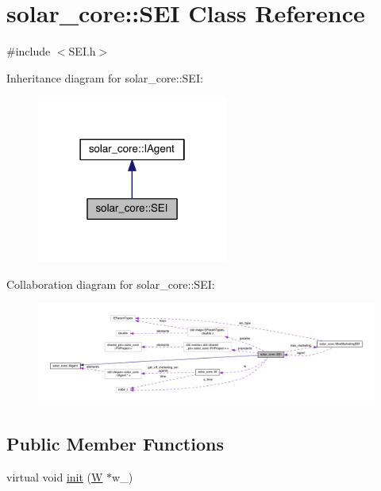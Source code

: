 \hypertarget{classsolar__core_1_1_s_e_i}{}\section{solar\+\_\+core\+:\+:S\+E\+I Class Reference}
\label{classsolar__core_1_1_s_e_i}


{\ttfamily \#include $<$S\+E\+I.\+h$>$}



Inheritance diagram for solar\+\_\+core\+:\+:S\+E\+I\+:
\nopagebreak
\begin{figure}[H]
\begin{center}
\leavevmode
\includegraphics[width=178pt]{classsolar__core_1_1_s_e_i__inherit__graph}
\end{center}
\end{figure}


Collaboration diagram for solar\+\_\+core\+:\+:S\+E\+I\+:
\nopagebreak
\begin{figure}[H]
\begin{center}
\leavevmode
\includegraphics[width=350pt]{classsolar__core_1_1_s_e_i__coll__graph}
\end{center}
\end{figure}
\subsection*{Public Member Functions}
{\bf }\par
\begin{DoxyCompactItemize}
\item 
virtual void \hyperlink{classsolar__core_1_1_s_e_i_a3dd3a3550f3de5cf4d36c2f83cbd1123}{init} (\hyperlink{classsolar__core_1_1_w}{W} $\ast$w\+\_\+)
\end{DoxyCompactItemize}

